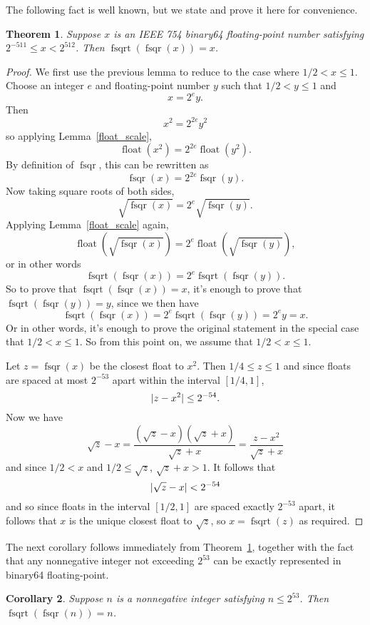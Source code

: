 \documentclass[a4paper]{article}
\DeclarePairedDelimiter\abs{\lvert}{\rvert}
\DeclareMathOperator{\fsqrt}{fsqrt}
\DeclareMathOperator{\fsqr}{fsqr}
\DeclareMathOperator{\float}{float}
\theoremstyle{plain}
\newtheorem{theorem}{Theorem}
\newtheorem{corollary}[theorem]{Corollary}
\theoremstyle{definition}
\begin{document}
The following fact is well known, but we state and prove it here for
convenience.

\begin{theorem}\label{sqrt_of_sqr}
  Suppose $x$ is an IEEE 754 binary64 floating-point number satisfying
  $2^{-511} \le x < 2^{512}$. Then $\fsqrt(\fsqr(x)) = x$.
\end{theorem}

\begin{proof}
  We first use the previous lemma to reduce to the case where $1/2 < x \le 1$.
  Choose an integer $e$ and floating-point number $y$ such that $1/2 < y \le 1$
  and
  $$x = 2^e y.$$
  Then
  $$x^2 = 2^{2e}y^2$$
  so applying Lemma~\ref{float_scale},
  $$\float(x^2) = 2^{2e}\float(y^2).$$
  By definition of $\fsqr$, this can be rewritten as
  $$\fsqr(x) = 2^{2e}\fsqr(y).$$
  Now taking square roots of both sides,
  $$\sqrt{\fsqr(x)} = 2^e \sqrt{\fsqr(y)}.$$
  Applying Lemma~\ref{float_scale} again,
  $$\float(\sqrt{\fsqr(x)}) = 2^e \float(\sqrt{\fsqr(y)}),$$
  or in other words
  $$\fsqrt(\fsqr(x)) = 2^e \fsqrt(\fsqr(y)).$$
  So to prove that $\fsqrt(\fsqr(x)) = x$, it's enough to prove that
  $\fsqrt(\fsqr(y)) = y$, since we then have
  $$\fsqrt(\fsqr(x)) = 2^e \fsqrt(\fsqr(y)) = 2^e y = x.$$
  Or in other words, it's enough to prove the original statement in the special
  case that $1/2 < x \le 1$. So from this point on, we assume that $1/2 < x \le
  1$.

  Let $z = \fsqr(x)$ be the closest float to $x^2$. Then $1/4 \le z \le 1$ and
  since floats are spaced at most $2^{-53}$ apart within the interval $[1/4,
  1]$,
  $$\abs{z - x^2} \le 2^{-54}.$$ Now we have
  $$\sqrt z - x = \frac{(\sqrt z - x)(\sqrt z + x)}{\sqrt z + x} = \frac{z -
  x^2}{\sqrt z + x}$$ and since $1/2 < x$ and $1/2 \le \sqrt z $, $\sqrt z + x
  > 1$. It follows that
  $$\abs{\sqrt z - x} < 2^{-54}$$ and so since floats in the interval $[1/2,
  1]$ are spaced exactly $2^{-53}$ apart, it follows that $x$ is the unique
  closest float to $\sqrt z$, so $x = \fsqrt(z)$ as required.
\end{proof}

The next corollary follows immediately from Theorem~\ref{sqrt_of_sqr}, together
with the fact that any nonnegative integer not exceeding $2^{53}$ can be
exactly represented in binary64 floating-point.

\begin{corollary}
  Suppose $n$ is a nonnegative integer satisfying $n \le 2^{53}$. Then
  $\fsqrt(\fsqr(n)) = n$.
\end{corollary}
\end{document}
